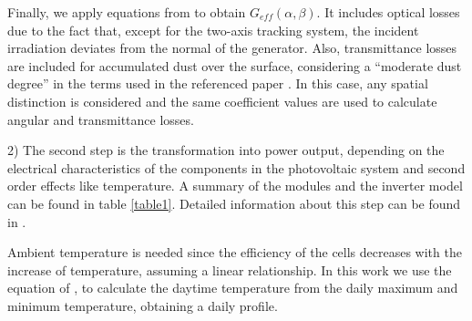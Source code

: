 Finally, we apply equations from \cite{Martin2001} to obtain $G_{eff}(\alpha, \beta)$. It includes optical losses due to the fact that, except for the two-axis tracking system, the incident irradiation deviates from the normal of the generator. Also, transmittance losses are included for accumulated dust over the surface, considering a ``moderate dust degree'' in the terms used in the referenced paper \cite{Martin2001}. In this case, any spatial distinction is considered and the same coefficient values are used to calculate angular and transmittance losses. 

2) The second step is the transformation into power output, depending on the electrical characteristics of the components in the photovoltaic system and second order effects like temperature. A summary of the modules and the inverter model can be found in table \ref{table1}. Detailed information about this step can be found in \cite{Perpinan2009}.

Ambient temperature is needed since the efficiency of the cells decreases with the increase of temperature, assuming a linear relationship. In this work we use the equation of \cite{Crook2011}, to calculate the daytime temperature from the daily maximum and minimum temperature, obtaining a daily profile. 


